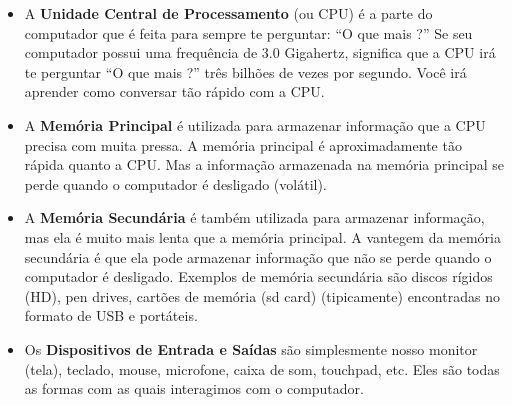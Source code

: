 \begin{itemize}
%

\item A {\bf Unidade Central de Processamento} (ou CPU) é
a parte do computador que é feita para sempre te perguntar:
``O que mais ?'' Se seu computador possui uma frequência de
3.0 Gigahertz, significa que a CPU irá te perguntar ``O que mais ?''
três bilhões de vezes por segundo. Você irá aprender como conversar
tão rápido com a CPU.
%

\item A {\bf Memória Principal} é utilizada para armazenar informação
que a CPU precisa com muita pressa. A memória principal é aproximadamente
tão rápida quanto a CPU. Mas a informação armazenada na memória principal
se perde quando o computador é desligado (volátil).
%

\item A {\bf Memória Secundária} é também utilizada para armazenar
informação, mas ela é muito mais lenta que a memória principal.
A vantegem da memória secundária é que ela pode armazenar informação
que não se perde quando o computador é desligado. Exemplos de memória
secundária são discos rígidos (HD), pen drives, cartões de memória (sd card)
(tipicamente) encontradas no formato de USB e portáteis.
%

\item Os {\bf Dispositivos de Entrada e Saídas} são simplesmente
nosso monitor (tela), teclado, mouse, microfone, caixa de som, touchpad, etc.
Eles são todas as formas com as quais interagimos com o computador.
%


\end{itemize}
